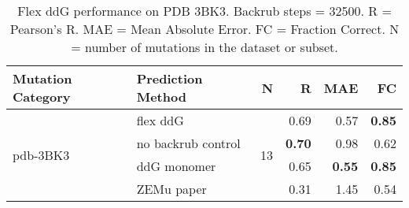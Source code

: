 \begin{table}
  \begin{tabular}{llrrrr}
\toprule
Mutation Category &   Prediction Method &   N &    R &  MAE &   FC \\
\midrule
 \multirow{ 4}{*}{pdb-3BK3} & flex ddG & \multirow{ 4}{*}{13} & 0.69 & 0.57 & \textbf{0.85}  \\
 & no backrub control & & \textbf{0.70} & 0.98 & 0.62  \\
 & ddG monomer & & 0.65 & \textbf{0.55} & \textbf{0.85}  \\
 & ZEMu paper & & 0.31 & 1.45 & 0.54  \\
\bottomrule
\end{tabular}
  \caption[Flex ddG performance on PDB 3BK3]{
    Flex ddG performance on PDB 3BK3. Backrub steps = 32500. R = Pearson's R. MAE = Mean Absolute Error. FC = Fraction Correct. N = number of mutations in the dataset or subset.
  } \label{tab:table-pdb-3BK3}
\end{table}
